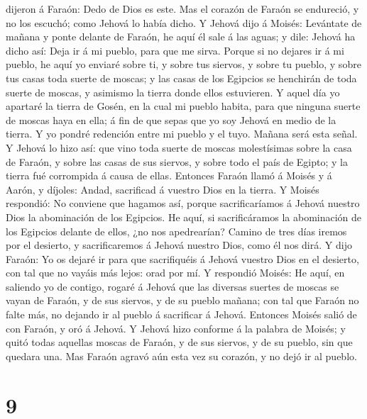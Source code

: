 dijeron á Faraón: Dedo de Dios es este. Mas el corazón de Faraón se
endureció, y no los escuchó; como Jehová lo había dicho.  Y
Jehová dijo á Moisés: Levántate de mañana y ponte delante de Faraón, he
aquí él sale á las aguas; y dile: Jehová ha dicho así: Deja ir á mi
pueblo, para que me sirva.  Porque si no dejares ir á mi
pueblo, he aquí yo enviaré sobre ti, y sobre tus siervos, y sobre tu
pueblo, y sobre tus casas toda suerte de moscas; y las casas de los
Egipcios se henchirán de toda suerte de moscas, y asimismo la tierra
donde ellos estuvieren.  Y aquel día yo apartaré la tierra
de Gosén, en la cual mi pueblo habita, para que ninguna suerte de moscas
haya en ella; á fin de que sepas que yo soy Jehová en medio de la
tierra.  Y yo pondré redención entre mi pueblo y el tuyo.
Mañana será esta señal.  Y Jehová lo hizo así: que vino
toda suerte de moscas molestísimas sobre la casa de Faraón, y sobre las
casas de sus siervos, y sobre todo el país de Egipto; y la tierra fué
corrompida á causa de ellas.  Entonces Faraón llamó á
Moisés y á Aarón, y díjoles: Andad, sacrificad á vuestro Dios en la
tierra.  Y Moisés respondió: No conviene que hagamos así,
porque sacrificaríamos á Jehová nuestro Dios la abominación de los
Egipcios. He aquí, si sacrificáramos la abominación de los Egipcios
delante de ellos, ¿no nos apedrearían?  Camino de tres días
iremos por el desierto, y sacrificaremos á Jehová nuestro Dios, como él
nos dirá.  Y dijo Faraón: Yo os dejaré ir para que
sacrifiquéis á Jehová vuestro Dios en el desierto, con tal que no vayáis
más lejos: orad por mí.  Y respondió Moisés: He aquí, en
saliendo yo de contigo, rogaré á Jehová que las diversas suertes de
moscas se vayan de Faraón, y de sus siervos, y de su pueblo mañana; con
tal que Faraón no falte más, no dejando ir al pueblo á sacrificar á
Jehová.  Entonces Moisés salió de con Faraón, y oró á
Jehová.  Y Jehová hizo conforme á la palabra de Moisés; y
quitó todas aquellas moscas de Faraón, y de sus siervos, y de su pueblo,
sin que quedara una.  Mas Faraón agravó aún esta vez su
corazón, y no dejó ir al pueblo.

\hypertarget{section-8}{%
\section{9}\label{section-8}}

